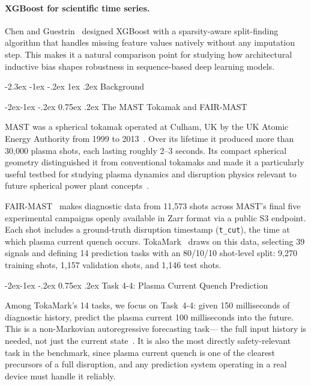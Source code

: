 \documentclass[10pt,twocolumn]{article}
\makeatletter
\renewcommand\section{\@startsection{section}{1}{\z@}%
  {-2.3ex \@plus -1ex \@minus -.2ex}%
  {1ex \@plus .2ex}%
  {\normalfont\Large\bfseries}}
\renewcommand\subsection{\@startsection{subsection}{2}{\z@}%
  {-2ex\@plus -1ex \@minus -.2ex}%
  {0.75ex \@plus .2ex}%
  {\normalfont\large\bfseries}}
\makeatother
\begin{document}
\paragraph{XGBoost for scientific time series.}
Chen and Guestrin~\cite{chen2016xgboost} designed XGBoost with a
sparsity-aware split-finding algorithm that handles missing feature
values natively without any imputation step. This makes it a natural
comparison point for studying how architectural inductive bias shapes
robustness in sequence-based deep learning models.

\section{Background}

\subsection{The MAST Tokamak and FAIR-MAST}

MAST was a spherical tokamak operated at Culham, UK by the UK Atomic
Energy Authority from 1999 to 2013~\cite{sykes2001, meyer2009}. Over
its lifetime it produced more than 30,000 plasma shots, each lasting
roughly 2--3 seconds. Its compact spherical geometry distinguished it
from conventional tokamaks and made it a particularly useful testbed
for studying plasma dynamics and disruption physics relevant to future
spherical power plant concepts~\cite{counsell2005}.

FAIR-MAST~\cite{jackson2024softwarex, jackson2025ieee} makes diagnostic
data from 11,573 shots across MAST's final five experimental campaigns
openly available in Zarr format via a public S3 endpoint. Each shot
includes a ground-truth disruption timestamp (\texttt{t\_cut}), the
time at which plasma current quench occurs. TokaMark~\cite{rousseau2026tokamark}
draws on this data, selecting 39 signals and defining 14 prediction
tasks with an 80/10/10 shot-level split: 9,270 training shots, 1,157
validation shots, and 1,146 test shots.

\subsection{Task 4-4: Plasma Current Quench Prediction}

Among TokaMark's 14 tasks, we focus on Task~4-4: given 150 milliseconds
of diagnostic history, predict the plasma current 100 milliseconds into
the future. This is a non-Markovian autoregressive forecasting task—
the full input history is needed, not just the current
state~\cite{rousseau2026tokamark}. It is also the most directly
safety-relevant task in the benchmark, since plasma current quench is
one of the clearest precursors of a full disruption, and any prediction
system operating in a real device must handle it reliably.
\end{document}
